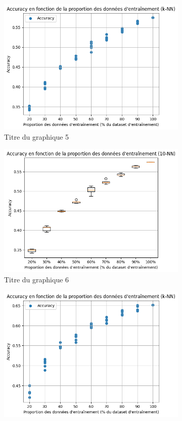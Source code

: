 \documentclass[12pt]{article}
\begin{document}
\begin{figure}[H]
\begin{subfigure}[t]{0.35\textwidth}
        \includegraphics[width=\textwidth]{static/knn_goo_10_raw.png}
        \caption{Titre du graphique 5}
    \end{subfigure}
    \hfill
    \begin{subfigure}[t]{0.35\textwidth}
        \centering
        \includegraphics[width=\textwidth]{static/knn_goo_10.png}
        \caption{Titre du graphique 6}
    \end{subfigure}
    \hfill
    \begin{subfigure}[t]{0.35\textwidth}
        \centering
        \includegraphics[width=\textwidth]{static/knn_cam_15_raw.png}

\end{subfigure}
\end{figure}
\end{document}

